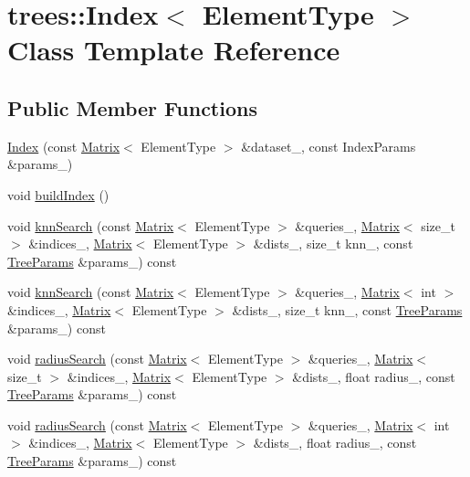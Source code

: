 \hypertarget{classtrees_1_1_index}{}\section{trees\+:\+:Index$<$ Element\+Type $>$ Class Template Reference}
\label{classtrees_1_1_index}
\subsection*{Public Member Functions}
\begin{DoxyCompactItemize}
\item 
\hyperlink{classtrees_1_1_index_a8ac9a102556cdf044f3384305b713d6d}{Index} (const \hyperlink{classtrees_1_1_matrix}{Matrix}$<$ Element\+Type $>$ \&dataset\+\_\+, const Index\+Params \&params\+\_\+)
\item 
void \hyperlink{classtrees_1_1_index_a893641c30781d8d75b4e22135f0cbd3e}{build\+Index} ()
\item 
void \hyperlink{classtrees_1_1_index_aee16af4d46ebb7d1697286fcccb50fb5}{knn\+Search} (const \hyperlink{classtrees_1_1_matrix}{Matrix}$<$ Element\+Type $>$ \&queries\+\_\+, \hyperlink{classtrees_1_1_matrix}{Matrix}$<$ size\+\_\+t $>$ \&indices\+\_\+, \hyperlink{classtrees_1_1_matrix}{Matrix}$<$ Element\+Type $>$ \&dists\+\_\+, size\+\_\+t knn\+\_\+, const \hyperlink{structtrees_1_1_tree_params}{Tree\+Params} \&params\+\_\+) const
\item 
void \hyperlink{classtrees_1_1_index_a62a5492569573064eb3043a4d623b4db}{knn\+Search} (const \hyperlink{classtrees_1_1_matrix}{Matrix}$<$ Element\+Type $>$ \&queries\+\_\+, \hyperlink{classtrees_1_1_matrix}{Matrix}$<$ int $>$ \&indices\+\_\+, \hyperlink{classtrees_1_1_matrix}{Matrix}$<$ Element\+Type $>$ \&dists\+\_\+, size\+\_\+t knn\+\_\+, const \hyperlink{structtrees_1_1_tree_params}{Tree\+Params} \&params\+\_\+) const
\item 
void \hyperlink{classtrees_1_1_index_ace6a01fd40aa0d7f1ff6c8389b883e2e}{radius\+Search} (const \hyperlink{classtrees_1_1_matrix}{Matrix}$<$ Element\+Type $>$ \&queries\+\_\+, \hyperlink{classtrees_1_1_matrix}{Matrix}$<$ size\+\_\+t $>$ \&indices\+\_\+, \hyperlink{classtrees_1_1_matrix}{Matrix}$<$ Element\+Type $>$ \&dists\+\_\+, float radius\+\_\+, const \hyperlink{structtrees_1_1_tree_params}{Tree\+Params} \&params\+\_\+) const
\item 
void \hyperlink{classtrees_1_1_index_a16c5f2b07bc57fe6fee53218c9d01bd3}{radius\+Search} (const \hyperlink{classtrees_1_1_matrix}{Matrix}$<$ Element\+Type $>$ \&queries\+\_\+, \hyperlink{classtrees_1_1_matrix}{Matrix}$<$ int $>$ \&indices\+\_\+, \hyperlink{classtrees_1_1_matrix}{Matrix}$<$ Element\+Type $>$ \&dists\+\_\+, float radius\+\_\+, const \hyperlink{structtrees_1_1_tree_params}{Tree\+Params} \&params\+\_\+) const
\end{DoxyCompactItemize}



